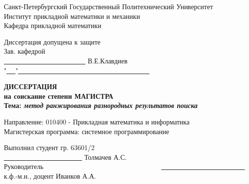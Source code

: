 \documentclass[12pt,a4paper]{report}
\begin{document}
\begin{titlepage}
\par
\vspace*{-4cm}
\begin{center}
{\large

Санкт-Петербургский Государственный Политехнический Университет\\
Институт прикладной математики и механики\\
Кафедра прикладной математики\\

\vspace*{0.5cm}

\begin{flushright}
Диссертация допущена к защите\\
Зав. кафедрой\ \ \ \ \ \ \ \ \ \ \ \ \ \ \ \ \ \ \ \ \ \ \ \ \ \ \ \\
\underline{ \ \ \ \ \ \ \ \ \ \ \ \ \ \ \ \ \ \ \ \ \ \ \ \ } В.Е.Клавдиев\\
"\underline{ \ \ }"\underline{ \ \ \ \ \ \ \ \ \ \ \ \ \ \ \ \ \ \ \ \ \ \ \ \ \ \ \ \ \ \ \ \ \ \ \ \ \ \ }
\end{flushright}

\vspace*{2.0cm}

{\Large
  \textbf{
    ДИССЕРТАЦИЯ\\
    на соискание степени МАГИСТРА\\
  }
}
\vspace*{1cm}
\textbf{
  Тема: \emph{метод ранжирования разнородных результатов поиска}\\
}

}

\vspace*{1.5cm}

\begin{flushleft}
Направление: 010400 - Прикладная математика и информатика\\
Магистерская программа: системное программирование\\
\end{flushleft}

\vspace*{1cm}

Выполнил студент гр. 63601/2 \ \ \ \ \ \ \ \ \ \ \ \ \ \ \ \ \ \ \ \ \ \ \ \ \ \ \ \ \ \ \ \ \ \ \ \ \ \underline{ \ \ \ \ \ \ \ \ \ \ \ \ \ \ \ \ \ \ \ \ \ \ \ } Толмачев А.С.\\
\vspace*{0.3cm}
Руководитель \ \ \ \ \ \ \ \ \ \ \ \ \ \ \ \ \ \ \ \ \ \ \ \ \ \ \ \ \ \ \ \ \ \ \underline{ \ \ \ \ \ \ \ \ \ \ \ \ \ \ \ \ \ \ \ \ \ \ \ \ } к.ф.-м.н., доцент Иванков А.А.
\vspace*{0.5cm}


\end{center}
\end{titlepage}
\end{document}
